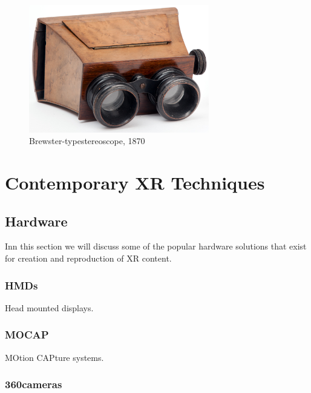 \begin{figure}[ht!]%
\centering
\includegraphics[width=0.7\textwidth]{img/stereoscope.jpg} 
\caption{Brewster-type\protect\footnotemark stereoscope, 1870 \cite{FileIGB032online}}
\end{figure}



\section{Contemporary XR Techniques}

\subsection{Hardware}
Inn this section we will discuss some of the popular hardware solutions that exist for creation and reproduction of XR content. 

\subsubsection{HMDs}
Head mounted displays.

\subsubsection{MOCAP}
MOtion CAPture systems. 

\subsubsection{360\textdegree cameras}

